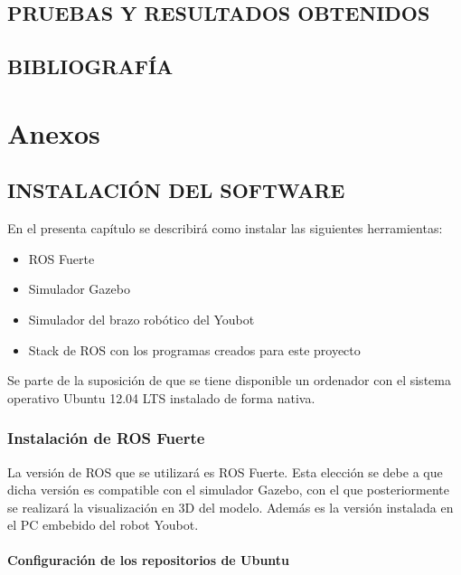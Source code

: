 \documentclass[12pt, a4paper]{report}
\begin{document}
\chapter{PRUEBAS Y RESULTADOS OBTENIDOS}


\chapter{BIBLIOGRAFÍA}



\part{Anexos}

\appendix

\chapter{INSTALACIÓN DEL SOFTWARE}

En el presenta capítulo se describirá como instalar las siguientes herramientas:

\begin{itemize}
\item{ROS Fuerte}
\item{Simulador Gazebo}
\item{Simulador del brazo robótico del Youbot}
\item{Stack de ROS con los programas creados para este proyecto}
\end{itemize}

Se parte de la suposición de que se tiene disponible un ordenador con el sistema operativo Ubuntu 12.04 LTS instalado de forma nativa.

\section{Instalación de ROS Fuerte}

La versión de ROS que se utilizará es ROS Fuerte. Esta elección se debe a que dicha versión es compatible con el simulador Gazebo, con el que posteriormente se realizará la visualización en 3D del modelo. Además es la versión instalada en el PC embebido del robot Youbot.\\

\subsection{Configuración de los repositorios de Ubuntu}
\end{document}
